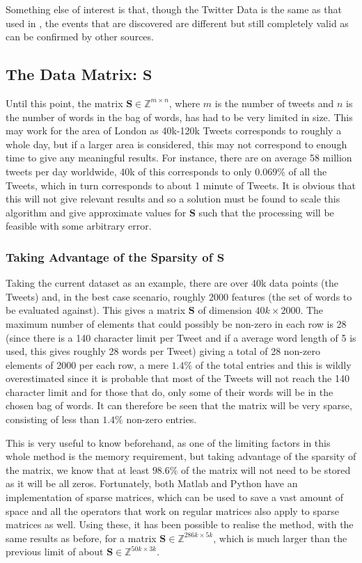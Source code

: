 \documentclass[11pt,a4paper]{article}
\newcommand{\smat}{\mathbf{S}}
\begin{document}
Something else of interest is that, though the Twitter Data is the same as that used in \cite{microblogs}, the events that are discovered are different but still completely valid as can be confirmed by other sources.

\subsection{The Data Matrix: $\smat$}
Until this point, the matrix $\mathbf{S} \in \mathbb{Z}^{m \times n}$, where $m$ is the number of tweets and $n$ is the number of words in the bag of words, has had to be very limited in size. This may work for the area of London as 40k-120k Tweets corresponds to roughly a whole day, but if a larger area is considered, this may not correspond to enough time to give any meaningful results. For instance,  there are on average 58 million tweets per day worldwide,\cite{statbrain} 40k of this corresponds to only $0.069\%$ of all the Tweets, which in turn corresponds to about 1 minute of Tweets. It is obvious that this will not give relevant results and so a solution must be found to scale this algorithm and give approximate values for $\mathbf{S}$ such that the processing will be feasible with some arbitrary error. 

\subsubsection{Taking Advantage of the Sparsity of $\mathbf{S}$}
\label{sparsity_matrix}

Taking the current dataset as an example, there are over 40k data points (the Tweets) and, in the best case scenario, roughly 2000 features (the set of words to be evaluated against). This gives a matrix $\mathbf{S}$ of dimension $40k\times 2000$. 
The maximum number of elements that could possibly be non-zero in each row is 28 (since there is a 140 character limit per Tweet and if a average word length of 5 is used, this gives roughly 28 words per Tweet) giving a total of 28 non-zero elements of 2000 per each row, a mere $1.4\%$ of the total entries and this is wildly overestimated since it is probable that most of the Tweets will not reach the 140 character limit and for those that do, only some of their words will be in the chosen bag of words. It can therefore be seen that the matrix will be very sparse, consisting of less than $1.4\%$ non-zero entries.

This is very useful to know beforehand, as one of the limiting factors in this whole method is the memory requirement, but taking advantage of the sparsity of the matrix, we know that at least $98.6\%$ of the matrix will not need to be stored as it will be all zeros. Fortunately, both Matlab and Python have an implementation of sparse matrices, which can be used to save a vast amount of space and all the operators that work on regular matrices also apply to sparse matrices as well. Using these, it has been possible to realise the method, with the same results as before, for a matrix $\mathbf{S} \in \mathbb{Z}^{286k\times5k}$, which is much larger than the previous limit of about $\mathbf{S} \in \mathbb{Z}^{50k\times3k}$.
\end{document}
